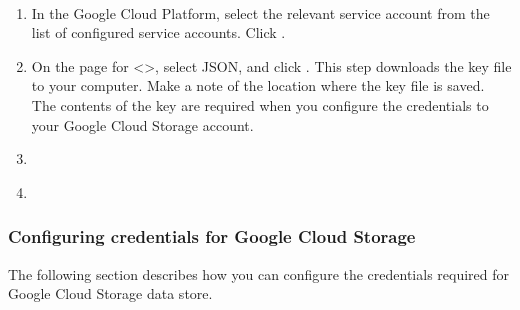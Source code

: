 \documentclass[letterpaper,10pt,english]{sphinxmanual}
\begin{document}
\paragraph{}
\label{\detokenize{mcdmp_app_ug:creating-a-key-for-the-service-account}}
\begin{enumerate}
\item {} 
In the Google Cloud Platform, select the relevant service account from the list of configured service accounts. Click .

\begin{figure}[htbp]
\centering

\noindent{}
\end{figure}

\item {} 
On the  page for \textless{}\textgreater{}, select JSON, and click . This step downloads the key file to your computer. Make a note of the location where the key file is saved. The contents of the key are required when you configure the credentials to your Google Cloud Storage account.

\begin{figure}[htbp]
\centering

\noindent{}
\end{figure}

\item {} 
{\hyperref[\detokenize{mcdmp_app_ug:config-creds-google-cloud-storage}]{}}

\item {} 
{\hyperref[\detokenize{mcdmp_app_ug:adding-google-cloud-storage}]{}}

\end{enumerate}
\begin{quote}
\label{\detokenize{mcdmp_app_ug:config-creds-google-cloud-storage}}\end{quote}


\subsubsection{Configuring credentials for Google Cloud Storage}
\label{\detokenize{mcdmp_app_ug:configuring-credentials-for-google-cloud-storage}}\label{\detokenize{mcdmp_app_ug:config-creds-google-cloud-storage}}
The following section describes how you can configure the credentials required for Google Cloud Storage data store.
\end{document}
